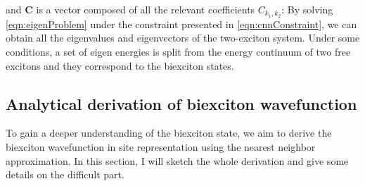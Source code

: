 and  $\mathbf{C}$ is a vector composed of all the relevant coefficients $C_{k_1, k_2}$:
By solving \autoref{eqn:eigenProblem} under the constraint presented in \autoref{eqn:cnnConstraint}, we can obtain
 all the eigenvalues and eigenvectors of the 
two-exciton system. Under some conditions, a set of eigen energies is split from the energy continuum of two free
 excitons and they correspond to the biexciton states. 



\subsection{Analytical derivation of biexciton wavefunction}
\label{sec:biexcitonWavefunction}
To gain a deeper understanding of the biexciton state, we aim to derive the biexciton wavefunction in site
 representation using the nearest neighbor approximation. In this section, I will sketch the whole derivation and give
 some details on the difficult part. 

